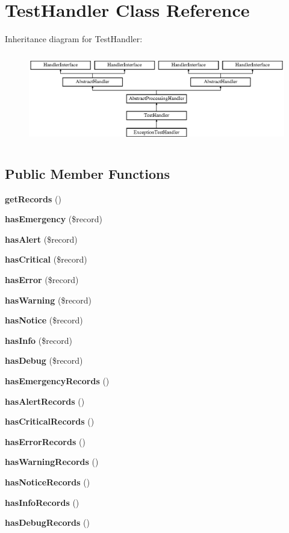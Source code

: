 \section{Test\+Handler Class Reference}
\label{class_monolog_1_1_handler_1_1_test_handler}
Inheritance diagram for Test\+Handler\+:\begin{figure}[H]
\begin{center}
\leavevmode
\includegraphics[height=4.000000cm]{class_monolog_1_1_handler_1_1_test_handler}
\end{center}
\end{figure}
\subsection*{Public Member Functions}
\begin{DoxyCompactItemize}
\item 
{\bf get\+Records} ()
\item 
{\bf has\+Emergency} (\$record)
\item 
{\bf has\+Alert} (\$record)
\item 
{\bf has\+Critical} (\$record)
\item 
{\bf has\+Error} (\$record)
\item 
{\bf has\+Warning} (\$record)
\item 
{\bf has\+Notice} (\$record)
\item 
{\bf has\+Info} (\$record)
\item 
{\bf has\+Debug} (\$record)
\item 
{\bf has\+Emergency\+Records} ()
\item 
{\bf has\+Alert\+Records} ()
\item 
{\bf has\+Critical\+Records} ()
\item 
{\bf has\+Error\+Records} ()
\item 
{\bf has\+Warning\+Records} ()
\item 
{\bf has\+Notice\+Records} ()
\item 
{\bf has\+Info\+Records} ()
\item 
{\bf has\+Debug\+Records} ()
\end{DoxyCompactItemize}
